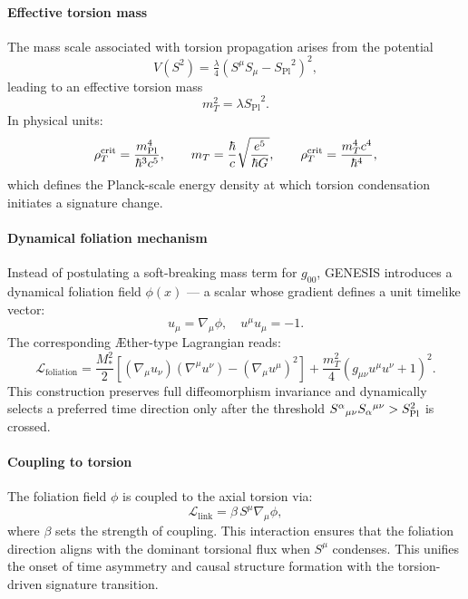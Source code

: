 \documentclass{article}
\newcommand{\Splanck}{\ensuremath{S_{\mathrm{Pl}}}}
\begin{document}
\paragraph{Effective torsion mass}
The mass scale associated with torsion propagation arises from the potential
\begin{equation}\label{eq:auto29}
V(S^2) = \tfrac{\lambda}{4}(S^\mu S_\mu - \Splanck^2)^2,
\end{equation}
leading to an effective torsion mass
\begin{equation}\label{eq:auto30}
m_T^2 = \lambda \Splanck^2.
\end{equation}
In physical units:
\begin{equation}\label{eq:auto31}
\rho_T^{\rm crit} = \frac{m_{\rm Pl}^4}{\hbar^3 c^5}, 
  \qquad 
  m_T = \frac{\hbar}{c} \sqrt{\frac{e^5}{\hbar G}}, 
  \qquad 
  \rho_T^{\rm crit} = \frac{m_T^4 c^4}{\hbar^4},
\end{equation}
which defines the Planck-scale energy density at which torsion condensation initiates a signature change.

\paragraph{Dynamical foliation mechanism}
Instead of postulating a soft-breaking mass term for $g_{00}$, GENESIS introduces a dynamical foliation field $\phi(x)$ — a scalar whose gradient defines a unit timelike vector:
\begin{equation}\label{eq:auto32}
u_\mu = \nabla_\mu \phi,
  \quad u^\mu u_\mu = -1.
\end{equation}
The corresponding Æther-type Lagrangian reads:
\begin{equation}\label{eq:auto33}
\mathcal{L}_{\text{foliation}} = \frac{M_*^2}{2} \left[ (\nabla_\mu u_\nu)(\nabla^\mu u^\nu) - (\nabla_\mu u^\mu)^2 \right] + \frac{m_T^2}{4} \left(g_{\mu\nu} u^\mu u^\nu + 1\right)^2.
\end{equation}
This construction preserves full diffeomorphism invariance and dynamically selects a preferred time direction only after the threshold $S^\alpha{}_{\mu\nu} S_\alpha{}^{\mu\nu} > S_{\rm Pl}^2$ is crossed.

\paragraph{Coupling to torsion}
The foliation field $\phi$ is coupled to the axial torsion via:
\begin{equation}\label{eq:auto34}
\mathcal{L}_{\text{link}} = \beta\, S^\mu \nabla_\mu \phi,
\end{equation}
where $\beta$ sets the strength of coupling. This interaction ensures that the foliation direction aligns with the dominant torsional flux when $S^\mu$ condenses. This unifies the onset of time asymmetry and causal structure formation with the torsion-driven signature transition.
\end{document}
